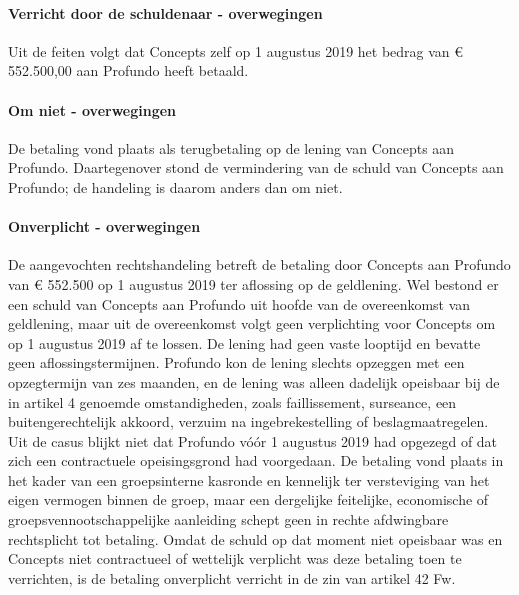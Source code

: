 \documentclass[
  dutch,
  a4paper,
]{article}
\begin{document}
\paragraph{Verricht door de schuldenaar - overwegingen}\label{verricht-door-de-schuldenaar---overwegingen-37}

Uit de feiten volgt dat Concepts zelf op 1 augustus 2019 het bedrag van € 552.500,00 aan Profundo heeft betaald.

\paragraph{Om niet - overwegingen}\label{om-niet---overwegingen-37}

De betaling vond plaats als terugbetaling op de lening van Concepts aan Profundo. Daartegenover stond de vermindering van de schuld van Concepts aan Profundo; de handeling is daarom anders dan om niet.

\paragraph{Onverplicht - overwegingen}\label{onverplicht---overwegingen-37}

De aangevochten rechtshandeling betreft de betaling door Concepts aan Profundo van € 552.500 op 1 augustus 2019 ter aflossing op de geldlening. Wel bestond er een schuld van Concepts aan Profundo uit hoofde van de overeenkomst van geldlening, maar uit de overeenkomst volgt geen verplichting voor Concepts om op 1 augustus 2019 af te lossen. De lening had geen vaste looptijd en bevatte geen aflossingstermijnen. Profundo kon de lening slechts opzeggen met een opzegtermijn van zes maanden, en de lening was alleen dadelijk opeisbaar bij de in artikel 4 genoemde omstandigheden, zoals faillissement, surseance, een buitengerechtelijk akkoord, verzuim na ingebrekestelling of beslagmaatregelen. Uit de casus blijkt niet dat Profundo vóór 1 augustus 2019 had opgezegd of dat zich een contractuele opeisingsgrond had voorgedaan. De betaling vond plaats in het kader van een groepsinterne kasronde en kennelijk ter versteviging van het eigen vermogen binnen de groep, maar een dergelijke feitelijke, economische of groepsvennootschappelijke aanleiding schept geen in rechte afdwingbare rechtsplicht tot betaling. Omdat de schuld op dat moment niet opeisbaar was en Concepts niet contractueel of wettelijk verplicht was deze betaling toen te verrichten, is de betaling onverplicht verricht in de zin van artikel 42 Fw.
\end{document}
